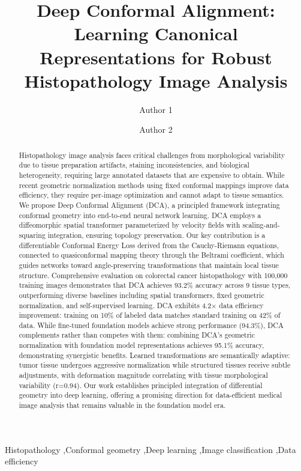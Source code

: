 \documentclass[final,3p,times,review,sort&compress]{elsarticle}
\begin{document}
\begin{frontmatter}

\title{Deep Conformal Alignment: Learning Canonical Representations for Robust Histopathology Image Analysis}


\author[aa]{Author 1}

\author[bb]{Author 2}




\address[aa]{Address 1}

\address[bb]{Address 2}




\begin{abstract}
Histopathology image analysis faces critical challenges from morphological variability due to tissue preparation artifacts, staining inconsistencies, and biological heterogeneity, requiring large annotated datasets that are expensive to obtain. While recent geometric normalization methods using fixed conformal mappings improve data efficiency, they require per-image optimization and cannot adapt to tissue semantics. We propose Deep Conformal Alignment (DCA), a principled framework integrating conformal geometry into end-to-end neural network learning. DCA employs a diffeomorphic spatial transformer parameterized by velocity fields with scaling-and-squaring integration, ensuring topology preservation. Our key contribution is a differentiable Conformal Energy Loss derived from the Cauchy-Riemann equations, connected to quasiconformal mapping theory through the Beltrami coefficient, which guides networks toward angle-preserving transformations that maintain local tissue structure. Comprehensive evaluation on colorectal cancer histopathology with 100,000 training images demonstrates that DCA achieves 93.2\% accuracy across 9 tissue types, outperforming diverse baselines including spatial transformers, fixed geometric normalization, and self-supervised learning. DCA exhibits 4.2$\times$ data efficiency improvement: training on 10\% of labeled data matches standard training on 42\% of data. While fine-tuned foundation models achieve strong performance (94.3\%), DCA complements rather than competes with them: combining DCA's geometric normalization with foundation model representations achieves 95.1\% accuracy, demonstrating synergistic benefits. Learned transformations are semantically adaptive: tumor tissue undergoes aggressive normalization while structured tissues receive subtle adjustments, with deformation magnitude correlating with tissue morphological variability (r=0.94). Our work establishes principled integration of differential geometry into deep learning, offering a promising direction for data-efficient medical image analysis that remains valuable in the foundation model era.
\end{abstract}

\begin{keyword}
Histopathology \sep Conformal geometry \sep Deep learning \sep Image classification \sep Data efficiency
\end{keyword}

\end{frontmatter}
\end{document}
